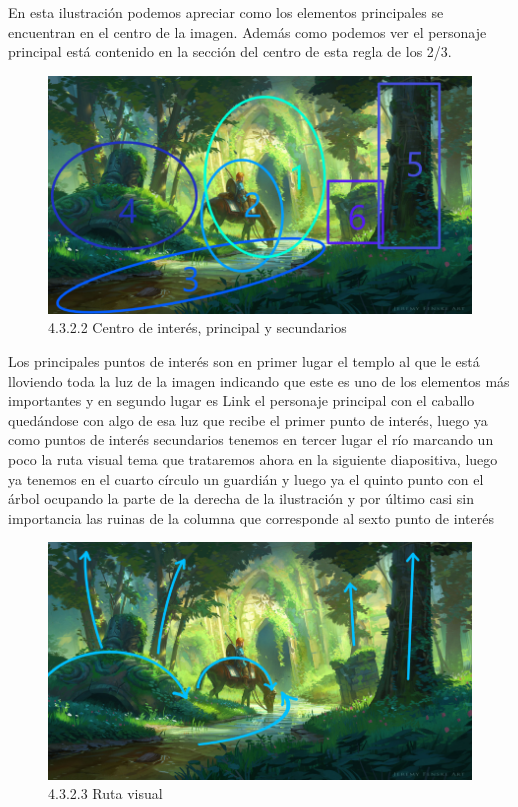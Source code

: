 \documentclass[12pt]{article}
\begin{document}
En esta ilustración podemos apreciar como los elementos principales se encuentran en el centro de la imagen. Además como podemos ver el personaje principal está contenido en la sección del centro de esta regla de los 2/3.

    \begin{figure}[H]
      \centering
      \includegraphics[scale=0.7]{images/Saúl/Sección 3/EA_img3_2Composicion_2PuntosInteres.png}
      \caption{\small 4.3.2.2 Centro de interés, principal y secundarios}
    \end{figure}

Los principales puntos de interés son en primer lugar el templo al que le está lloviendo toda la luz de la imagen indicando que este es uno de los elementos más importantes y en segundo lugar es Link el personaje principal con el caballo quedándose con algo de esa luz que recibe el primer punto de interés, luego ya como puntos de interés secundarios tenemos en tercer lugar el río marcando un poco la ruta visual tema que trataremos ahora en la siguiente diapositiva, luego ya tenemos en el cuarto círculo un guardián y luego ya el quinto punto con el árbol ocupando la parte de la derecha de la ilustración y por último casi sin importancia las ruinas de la columna que corresponde al sexto punto de interés

    \begin{figure}[H]
      \centering
      \includegraphics[scale=0.7]{images/Saúl/Sección 3/EA_img3_2Composicion_3RutaVisual.png}
      \caption{\small 4.3.2.3 Ruta visual}
    \end{figure}
\end{document}
